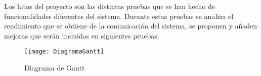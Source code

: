 Los hitos del proyecto son las distintas pruebas que se han hecho de funcionalidades diferentes del
sistema. Durante estas pruebas se analiza el rendimiento que se obtiene de la comunicación del sistema,
se proponen y añaden mejoras que serán incluidas en siguientes pruebas.

\begin{figure}[t]
	 {
		\texttt{[image: DiagramaGantt]}
	}
	\caption{Diagrama de Gantt}
	\label{fig:gantt}
\end{figure}
